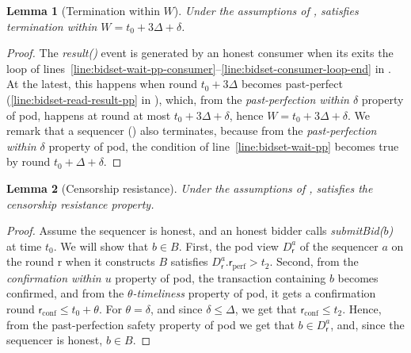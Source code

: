 \documentclass[pdflatex,sn-mathphys-num]{sn-jnl}%
\theoremstyle{thmstyleone}%
\theoremstyle{thmstyletwo}%
\theoremstyle{thmstylethree}%
\newtheorem{lemma}{Lemma}
\newcommand{\podtm}{\textsf{pod}\xspace}
\newcommand{\op}[1]{\textsl{#1}}
\newcommand{\operand}[1]{\textsf{#1}}
\newcommand{\round}{\operand{r}\xspace}
\newcommand{\rconf}{\ensuremath{\round_\text{conf}}\xspace}
\newcommand{\rperf}{\ensuremath{\round_\text{perf}}\xspace}
\newcommand{\parConf}{\ensuremath{u}\xspace}
\newcommand{\parTemp}{\ensuremath{\theta}\xspace}
\newcommand{\parAuctionTerm}{\ensuremath{W}\xspace}
\newcommand{\Pod}{\ensuremath{D}\xspace}
\newcommand{\podView}[2]{\ensuremath{\Pod_{#2}^{#1}}\xspace}
\newcommand{\tzero}{\ensuremath{t_0}\xspace}
\newcommand{\ttwo}{\ensuremath{t_2}\xspace}
\newcommand{\auc}{\ensuremath{a}\xspace}
\newcommand{\bag}{\ensuremath{B}\xspace}
\newcommand{\opResult}[1]{\op{result(#1)}\xspace}
\newcommand{\opSubmitBid}[1]{\op{submitBid(#1)}\xspace}
\newcommand{\bid}{\ensuremath{b}\xspace}
\begin{document}
\begin{appendices}
\begin{lemma}[Termination within \parAuctionTerm]\label{lem:bidset-termination}
    Under the assumptions of ,  satisfies \emph{termination within $\parAuctionTerm = \tzero + 3\Delta + \delta$}.
\end{lemma}
\begin{proof}
    The \opResult{} event is generated by an honest consumer when its exits the loop of lines~\ref{line:bidset-wait-pp-consumer}--\ref{line:bidset-consumer-loop-end} in . At the latest, this happens when round $\tzero + 3\Delta$ becomes past-perfect (\cref{line:bidset-read-result-pp} in ), which, from the \emph{past-perfection within $\delta$} property of \podtm, happens at round at most $\tzero + 3\Delta + \delta$, hence $\parAuctionTerm = \tzero + 3\Delta + \delta$.
    We remark that a sequencer () also terminates, because from the \emph{past-perfection within $\delta$} property of \podtm, the condition of line~\ref{line:bidset-wait-pp} becomes true by round $\tzero + \Delta + \delta$.
\end{proof}

\begin{lemma}[Censorship resistance]\label{lem:bidset-censorship}
    Under the assumptions of ,  satisfies the \emph{censorship resistance} property.
\end{lemma}
\begin{proof}
    Assume the sequencer is honest, and an honest bidder calls \opSubmitBid{\bid} at time \tzero. We will show that $\bid \in \bag$.
    First, the \podtm view $\podView{\auc}{\round}$ of the sequencer \auc on the round \round when it constructs \bag satisfies $\podView{\auc}{\round}.\rperf > \ttwo$.
    Second, from the \emph{confirmation within \parConf} property of \podtm, the transaction containing \bid becomes confirmed, and from the \emph{\parTemp-timeliness} property of \podtm, it gets a confirmation round $\rconf \leq \tzero + \parTemp$. For $\parTemp = \delta$, and since $\delta \leq \Delta$, we get that $\rconf \leq \ttwo$.
    Hence, from the past-perfection safety property of \podtm we get that $\bid \in \podView{\auc}{\round}$, and, since the sequencer is honest, $\bid \in \bag$.
\end{proof}


\end{appendices}
\end{document}
